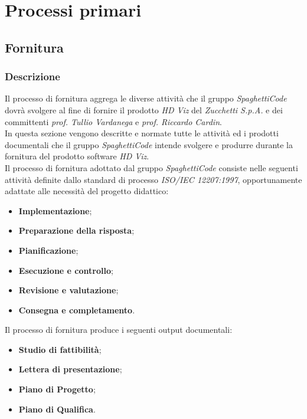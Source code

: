 \section{Processi primari}
\label{sec:processi_primari}

\subsection{Fornitura}
\label{sub:fornitura}

\subsubsection{Descrizione}
Il processo di fornitura aggrega le diverse attività che il gruppo \emph{SpaghettiCode} dovrà svolgere al fine di fornire il prodotto \emph{HD Viz} del  \emph{Zucchetti S.p.A.} e dei committenti \emph{prof. Tullio Vardanega} e \emph{prof. Riccardo Cardin}.\\

In questa sezione vengono descritte e normate tutte le attività ed i prodotti documentali che il gruppo \emph{SpaghettiCode} intende svolgere e produrre durante la fornitura del prodotto software \emph{HD Viz}.\\

Il processo di fornitura adottato dal gruppo \emph{SpaghettiCode} consiste nelle seguenti attività definite dallo standard di processo \emph{ISO/IEC 12207:1997}, opportunamente adattate alle necessità del progetto didattico:
\begin{itemize}
    \item \textbf{Implementazione};
    \item \textbf{Preparazione della risposta};
    \item \textbf{Pianificazione};
    \item \textbf{Esecuzione e controllo};
    \item \textbf{Revisione e valutazione};
    \item \textbf{Consegna e completamento}.
\end{itemize}

Il processo di fornitura produce i seguenti output documentali:
\begin{itemize}
    \item \textbf{Studio di fattibilità};
    \item \textbf{Lettera di presentazione};
	\item \textbf{Piano di Progetto};
	\item \textbf{Piano di Qualifica}.
\end{itemize}

